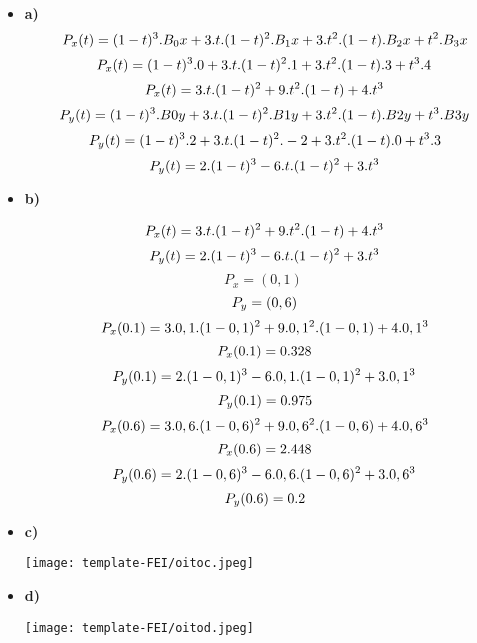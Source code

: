 \documentclass[a4paper, 12pt]{article}
\begin{document}
\begin{itemize}
\item\textbf{a)}
\[P_x(t) = (1-t)^3.B_0x+3.t.(1-t)^2.B_1x+3.t^2.(1-t).B_2x+t^2.B_3x
\vspace{0.5cm}\]
\[P_x(t) = (1-t)^3.0+3.t.(1-t)^2.1+3.t^2.(1-t).3+t^3.4
\vspace{0.5cm}\]
\[P_x(t) = 3.t.(1-t)^2+9.t^2.(1-t)+4.t^3
\vspace{0.5cm}
\]
\[P_y(t) = (1-t)^3.B0y+3.t.(1-t)^2.B1y+3.t^2.(1-t).B2y+t^3.B3y
\vspace{0.5cm}\]
\[P_y(t) = (1-t)^3.2+3.t.(1-t)^2.-2+3.t^2.(1-t).0+t^3.3
\vspace{0.5cm}\]
\[P_y(t) = 2.(1-t)^3-6.t.(1-t)^2+3.t^3
\vspace{0.5cm}
\]
\item\textbf{b)}

\[P_x(t) = 3.t.(1-t)^2+9.t^2.(1-t)+4.t^3
\vspace{0.5cm}\]
\[P_y(t) = 2.(1-t)^3-6.t.(1-t)^2+3.t^3
\vspace{0.5cm}
\]
\[P_x=(0,1)
\
\]
\[P_y=(0,6)
\vspace{0.5cm}
\]
\[P_x(0.1) = 3.0,1.(1-0,1)^2+9.0,1^2.(1-0,1)+4.0,1^3
\vspace{0.5cm}\]
\[P_x(0.1) = 0.328
\vspace{0.5cm}\]
\[P_y(0.1) = 2.(1-0,1)^3-6.0,1.(1-0,1)^2+3.0,1^3
\vspace{0.5cm}\]
\[P_y(0.1) = 0.975
\vspace{0.5cm}
\]
\[P_x(0.6) = 3.0,6.(1-0,6)^2+9.0,6^2.(1-0,6)+4.0,6^3
\vspace{0.5cm}\]
\[P_x(0.6) = 2.448
\vspace{0.5cm}
\]
\[P_y(0.6) = 2.(1-0,6)^3-6.0,6.(1-0,6)^2+3.0,6^3
\vspace{0.5cm}\]
\[P_y(0.6) = 0.2
\vspace{0.5cm}\]
\item\textbf{c)}
\begin{center}
   \texttt{[image: template-FEI/oitoc.jpeg]} 
\end{center}
\item\textbf{d)}
\begin{center}
   \texttt{[image: template-FEI/oitod.jpeg]} 
\end{center}
\vspace{0.5cm}
\vspace{0.5cm}
\end{itemize}
\end{document}
